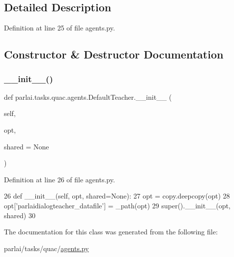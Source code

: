 \subsection{Detailed Description}


Definition at line 25 of file agents.\+py.



\subsection{Constructor \& Destructor Documentation}
\mbox{\label{classparlai_1_1tasks_1_1quac_1_1agents_1_1DefaultTeacher_a45c9f1c71c4c5c93e7fe32685a8fd4e9}} 
\subsubsection{\texorpdfstring{\+\_\+\+\_\+init\+\_\+\+\_\+()}{\_\_init\_\_()}}
{\footnotesize\ttfamily def parlai.\+tasks.\+quac.\+agents.\+Default\+Teacher.\+\_\+\+\_\+init\+\_\+\+\_\+ (\begin{DoxyParamCaption}\item[{}]{self,  }\item[{}]{opt,  }\item[{}]{shared = {\ttfamily None} }\end{DoxyParamCaption})}



Definition at line 26 of file agents.\+py.


\begin{DoxyCode}
26     \textcolor{keyword}{def }\_\_init\_\_(self, opt, shared=None):
27         opt = copy.deepcopy(opt)
28         opt[\textcolor{stringliteral}{'parlaidialogteacher\_datafile'}] = \_path(opt)
29         super().\_\_init\_\_(opt, shared)
30 \end{DoxyCode}


The documentation for this class was generated from the following file\+:\begin{DoxyCompactItemize}
\item 
parlai/tasks/quac/\hyperlink{parlai_2tasks_2quac_2agents_8py}{agents.\+py}\end{DoxyCompactItemize}
